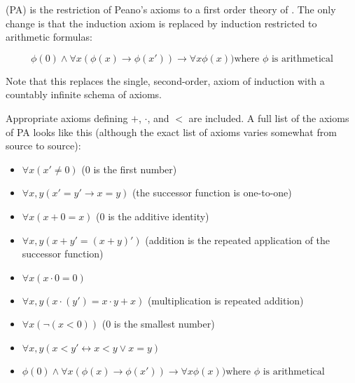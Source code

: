 \documentclass[12pt]{article}
\begin{document}
 (PA) is the restriction of Peano's axioms to a first order theory of .  The only change is that the induction axiom is replaced by induction restricted to arithmetic formulas:

$$\phi(0)\wedge \forall x(\phi(x)\rightarrow\phi(x'))\rightarrow \forall x\phi(x)) \text{where }\phi\text{ is arithmetical}$$

Note that this replaces the single, second-order, axiom of induction with a countably infinite schema of axioms.

Appropriate axioms defining $+$, $\cdot$, and $<$ are included.  A full list of the axioms of PA looks like this (although the exact list of axioms varies somewhat from source to source):
\begin{itemize}
\item $\forall x (x'\neq 0)$ ($0$ is the first number)

\item $\forall x,y (x'=y'\rightarrow x=y)$ (the successor function is one-to-one)

\item $\forall x (x+0=x)$ ($0$ is the additive identity)

\item $\forall x,y(x+y'=(x+y)')$ (addition is the repeated application of the successor function)

\item $\forall x(x\cdot 0=0)$

\item $\forall x,y(x\cdot(y')=x\cdot y+x)$ (multiplication is repeated addition)

\item $\forall x(\neg (x<0))$ ($0$ is the smallest number)

\item $\forall x,y(x<y'\leftrightarrow x<y\vee x=y)$

\item $\phi(0)\wedge \forall x(\phi(x)\rightarrow\phi(x'))\rightarrow \forall x\phi(x)) \text{where }\phi\text{ is arithmetical}$

\end{itemize}
\end{document}
